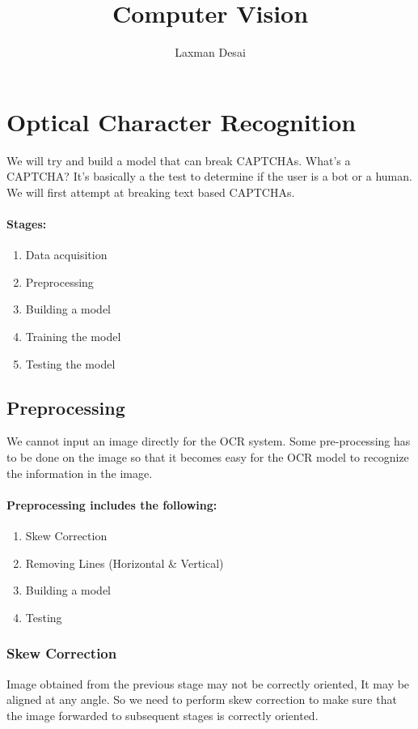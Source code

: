 \documentclass[12pt]{article}
\title{Computer Vision}
\author{Laxman Desai}
\theoremstyle{mytheoremstyle}
\theoremstyle{mytheoremstyle}
\theoremstyle{myproblemstyle}
\begin{document}
\maketitle
\tableofcontents

\pagebreak
\section{Optical Character Recognition}

  We will try and build a model that can break CAPTCHAs. What's a CAPTCHA? It's basically a the test to determine if the user is a bot or a human. We will first attempt at breaking text based CAPTCHAs.
  
  \paragraph{Stages:}
  \begin{enumerate}
    \item Data acquisition
    \item Preprocessing
    \item Building a model
    \item Training the model
    \item Testing the model
  \end{enumerate}

  \subsection{Preprocessing}
    We cannot input an image directly for the OCR system. Some pre-processing has to be done on the image so that it becomes easy for the OCR model to recognize the information in the image.

    \paragraph{Preprocessing includes the following:}
    \begin{enumerate}
      \item Skew Correction
      \item Removing Lines (Horizontal \&  Vertical)
      \item Building a model
      \item Testing
    \end{enumerate}
    
    \subsubsection{Skew Correction}
      Image obtained from the previous stage may not be correctly oriented, It may be aligned at any angle. So we need to perform skew correction to make sure that the image forwarded to subsequent stages is correctly oriented.
      
\end{document}
